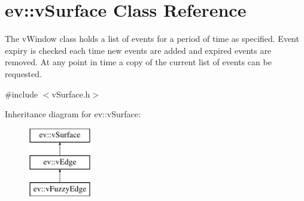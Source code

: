 \hypertarget{classev_1_1vSurface}{}\section{ev\+:\+:v\+Surface Class Reference}
\label{classev_1_1vSurface}


The v\+Window class holds a list of events for a period of time as specified. Event expiry is checked each time new events are added and expired events are removed. At any point in time a copy of the current list of events can be requested.  




{\ttfamily \#include $<$v\+Surface.\+h$>$}

Inheritance diagram for ev\+:\+:v\+Surface\+:\begin{figure}[H]
\begin{center}
\leavevmode
\includegraphics[height=3.000000cm]{classev_1_1vSurface}
\end{center}
\end{figure}
